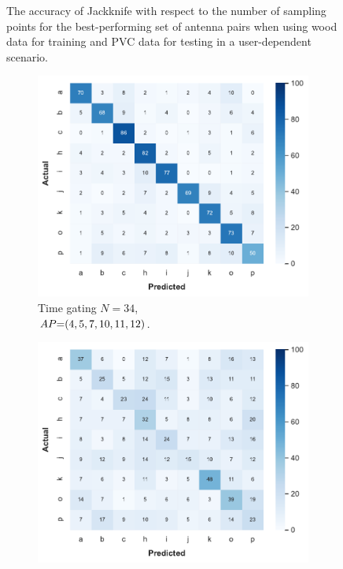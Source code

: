 \begin{figure}[ht]
    \vspace{-6pt}
    \caption{The accuracy of Jackknife with respect to the number of sampling points for the best-performing set of antenna pairs when using wood data for training and PVC data for testing in a user-dependent scenario.}
    \label{fig:radar-experiments:through-materials:wood-pvc-samples}
\end{figure}

\begin{figure}[ht]
    \begin{subfigure}{.49\textwidth}
        \centering
        \includegraphics[width=.99\linewidth]{Figures/RadarExperiments/Datasets/ThroughMaterials/Wood+PVC/confusion-timegating-ud.pdf}
        \vspace{-5pt}
        \captionsetup{width=.99\linewidth}
        \caption{Time gating $N{=}34$, \\ $\splitatcommas{AP{=}(4, 5, 7, 10, 11, 12)}$.}
        \label{fig:radar-experiments:through-materials:wood-pvc-confusion:timegating-ud}
    \end{subfigure}
    \begin{subfigure}{.49\textwidth}
        \centering
        \includegraphics[width=.99\linewidth]{Figures/RadarExperiments/Datasets/ThroughMaterials/Wood+PVC/confusion-filtering-ud.pdf}

\end{subfigure}
\end{figure}
